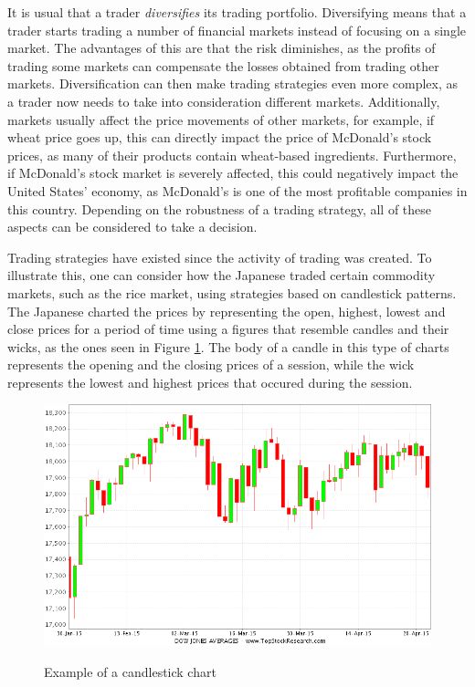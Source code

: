 It is usual that a trader \textit{diversifies} its trading portfolio. Diversifying means that a trader starts trading a number of financial markets instead of focusing on a single market. The advantages of this %
are that the risk diminishes, as the profits of trading some markets can compensate the losses obtained from trading other markets. Diversification can then make trading strategies even more complex, as a trader now needs to take into consideration different markets. Additionally, markets usually affect the price movements of other markets, for example, if wheat price goes up, this can directly impact the price of McDonald's stock prices, as many of their products contain wheat-based ingredients. Furthermore, if McDonald's stock market is severely affected, this could negatively impact the United States' economy, as McDonald's is one of the most profitable companies in this country. Depending on the robustness of a trading strategy, all of these aspects can be considered to take a decision.

Trading strategies have existed since the activity of trading was created. To illustrate this, one can consider how the Japanese traded certain commodity markets, such as the rice market, using strategies based on candlestick patterns. %
The Japanese charted the prices by representing the open, highest, lowest and close prices for a period of time using a figures that resemble candles and their wicks, as the ones seen in Figure \ref{figure:candlestick-chart}. The body of a candle in this type of charts represents the opening and the closing prices of a session, while the wick represents the lowest and highest prices that occured during the session.


\begin{figure}
\caption{Example of a candlestick chart}
\centering
\includegraphics[width=1.0\textwidth]{img/candlestick-chart.png}
\label{figure:candlestick-chart}
\end{figure}

